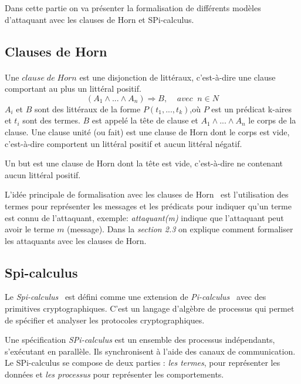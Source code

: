 \documentclass[10pt,a4paper]{article}
\begin{document}
Dans cette partie on va présenter la formalisation de différents modèles d'attaquant avec les clauses de Horn et SPi-calculus.   
\subsection{Clauses de Horn}
\paragraph{}
Une $clause\; de\; Horn$ est une disjonction de littéraux, c'est-à-dire une clause comportant au plus un littéral positif.  
\[(A_{1}\wedge...\wedge A_{n})\Rightarrow B ,\;\;\;\; avec\;\; n \in N  \]
$A_{i}$ et $B$ sont des littéraux de la forme $P(t_{1},...,t_{k})$,où $P$ est un prédicat k-aires et $t_{i}$ sont des termes. $B$ est appelé la t\^{e}te de clause et $A_{1}\wedge...\wedge A_{n}$ le corps de la clause. Une clause unité (ou fait) est une clause de Horn dont le corps est vide, c'est-à-dire comportent un littéral positif et aucun littéral négatif.\newline

Un but est une clause de Horn dont la t\^{e}te est vide, c'est-à-dire ne contenant aucun littéral positif. 		    \newline

L'idée principale de formalisation avec les clauses de Horn~\cite{ref2} est l’utilisation des
termes pour représenter les messages et les prédicats pour indiquer qu'un terme est connu de l'attaquant, exemple: \textit{attaquant(m)} indique que l'attaquant peut avoir le terme $m$   (message). Dans la \textit{section 2.3} on explique comment formaliser les attaquants avec les clauses de Horn.
\subsection{Spi-calculus}
Le \textit{Spi-calculus}~\cite{ref7} est défini comme une extension de \textit{Pi-calculus}~\cite{ref8} avec des primitives cryptographiques. C'est un langage d'algèbre de processus qui permet de spécifier et analyser les protocoles cryptographiques.\newline

Une spécification \textit{SPi-calculus} est un ensemble des processus indépendants, s'exécutant en parallèle. Ils synchronisent à l'aide des canaux de communication. Le SPi-calculus se compose de deux parties : \textit{les termes}, pour représenter les données et \textit{les processus} pour représenter les comportements.\newline
\end{document}
